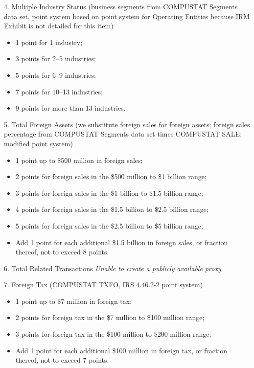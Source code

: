 \documentclass[12pt]{article}
\begin{document}
4. Multiple Industry Status (business segments from COMPUSTAT Segments data set, point system based on point system for Operating Entities because IRM Exhibit is not detailed for this item)
\begin{itemize}
   \item 1 point for 1 industry;
   \item 3 points for 2--5 industries;
   \item 5 points for 6--9 industries;
   \item 7 points for 10--13 industries;
   \item 9 points for more than 13 industries.
\end{itemize}
\vspace{\baselineskip}

5. Total Foreign Assets (we substitute foreign sales for foreign assets; foreign sales percentage from COMPUSTAT Segments data set times COMPUSTAT SALE; modified point system)
\begin{itemize}
   \item 1 point up to \$500 million in foreign sales;
   \item 2 points for foreign sales in the \$500 million to \$1 billion range;
   \item 3 points for foreign sales in the \$1 billion to \$1.5 billion range;
   \item 4 points for foreign sales in the \$1.5 billion to \$2.5 billion range;
   \item 5 points for foreign sales in the \$2.5 billion to \$5 billion range;
   \item Add 1 point for each additional \$1.5 billion in foreign sales, or fraction thereof, not to exceed 8 points.
\end{itemize}
\vspace{\baselineskip}

6. Total Related Transactions
\textit{Unable to create a publicly available proxy} \\
\vspace{\baselineskip}

7. Foreign Tax (COMPUSTAT TXFO, IRS 4.46.2-2 point system)
\begin{itemize}
   \item 1 point up to \$7 million in foreign tax;
   \item 2 points for foreign tax in the \$7 million to \$100 million range;
   \item 3 points for foreign tax in the \$100 million to \$200 million range;
   \item Add 1 point for each additional \$100 million in foreign tax, or fraction thereof, not to exceed 7 points.
\end{itemize}
\vspace{\baselineskip}
\vspace{\baselineskip}
\end{document}
